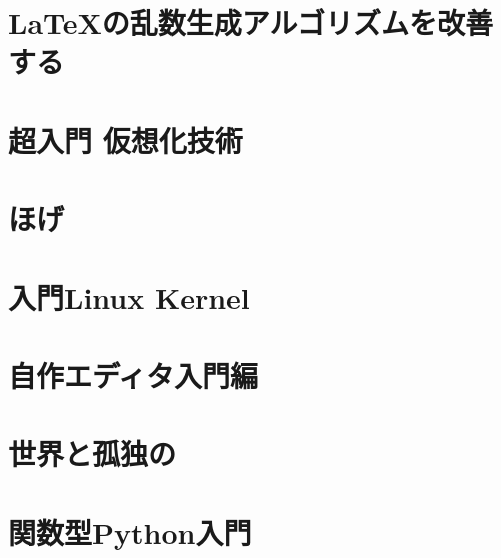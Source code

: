 \documentclass[autodetect-engine,dvipdfmx-if-dvi,ja=standard,a5paper,12pt,twoside,openany,layout=v2,tombow]{bxjsbook}
\newcommand{\articlepath}{./articles}
\begin{document}
\chapter{\LaTeX の乱数生成アルゴリズムを改善する}


\chapter{超入門 仮想化技術}


\chapter{ほげ}


\chapter{入門Linux Kernel}


\chapter{自作エディタ入門編}


\chapter{世界と孤独の}


\chapter{関数型Python入門}


\newpage
\myimpression
\end{document}
